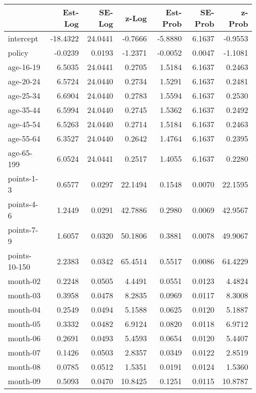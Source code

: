 \documentclass[10pt]{article}
\begin{document}
\begin{table}[ht]
\centering
\begin{tabular}{lrrrrrr}
  \hline
 & Est-Log & SE-Log & z-Log & Est-Prob & SE-Prob & z-Prob \\ 
  \hline
intercept & -18.4322 & 24.0441 & -0.7666 & -5.8880 & 6.1637 & -0.9553 \\ 
  policy & -0.0239 & 0.0193 & -1.2371 & -0.0052 & 0.0047 & -1.1081 \\ 
  age-16-19 & 6.5035 & 24.0441 & 0.2705 & 1.5184 & 6.1637 & 0.2463 \\ 
  age-20-24 & 6.5724 & 24.0440 & 0.2734 & 1.5291 & 6.1637 & 0.2481 \\ 
  age-25-34 & 6.6904 & 24.0440 & 0.2783 & 1.5594 & 6.1637 & 0.2530 \\ 
  age-35-44 & 6.5994 & 24.0440 & 0.2745 & 1.5362 & 6.1637 & 0.2492 \\ 
  age-45-54 & 6.5263 & 24.0440 & 0.2714 & 1.5184 & 6.1637 & 0.2463 \\ 
  age-55-64 & 6.3527 & 24.0440 & 0.2642 & 1.4764 & 6.1637 & 0.2395 \\ 
  age-65-199 & 6.0524 & 24.0441 & 0.2517 & 1.4055 & 6.1637 & 0.2280 \\ 
  points-1-3 & 0.6577 & 0.0297 & 22.1494 & 0.1548 & 0.0070 & 22.1595 \\ 
  points-4-6 & 1.2449 & 0.0291 & 42.7886 & 0.2980 & 0.0069 & 42.9567 \\ 
  points-7-9 & 1.6057 & 0.0320 & 50.1806 & 0.3881 & 0.0078 & 49.9067 \\ 
  points-10-150 & 2.2383 & 0.0342 & 65.4514 & 0.5517 & 0.0086 & 64.4229 \\ 
  month-02 & 0.2248 & 0.0505 & 4.4491 & 0.0551 & 0.0123 & 4.4824 \\ 
  month-03 & 0.3958 & 0.0478 & 8.2835 & 0.0969 & 0.0117 & 8.3008 \\ 
  month-04 & 0.2549 & 0.0494 & 5.1588 & 0.0625 & 0.0120 & 5.1887 \\ 
  month-05 & 0.3332 & 0.0482 & 6.9124 & 0.0820 & 0.0118 & 6.9712 \\ 
  month-06 & 0.2691 & 0.0493 & 5.4593 & 0.0654 & 0.0120 & 5.4407 \\ 
  month-07 & 0.1426 & 0.0503 & 2.8357 & 0.0349 & 0.0122 & 2.8519 \\ 
  month-08 & 0.0785 & 0.0512 & 1.5351 & 0.0191 & 0.0124 & 1.5360 \\ 
  month-09 & 0.5093 & 0.0470 & 10.8425 & 0.1251 & 0.0115 & 10.8787 \\ 

\end{tabular}
\end{table}
\end{document}
